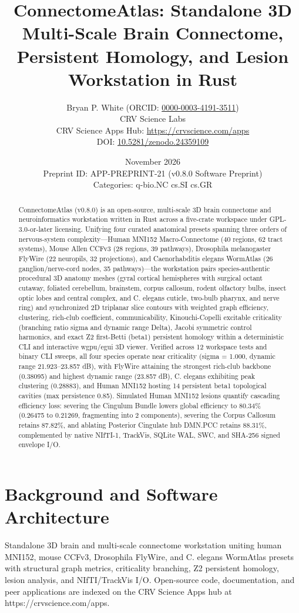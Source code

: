 \documentclass[10pt,letterpaper]{article}
\title{\textbf{ConnectomeAtlas: Standalone 3D Multi-Scale Brain Connectome, Persistent Homology, and Lesion Workstation in Rust}}
\author{Bryan P. White (ORCID: \href{https://orcid.org/0000-0003-4191-3511}{0000-0003-4191-3511}) \\ CRV Science Labs \\ \small CRV Science Apps Hub: \url{https://crvscience.com/apps} \\ \small DOI: \href{https://doi.org/10.5281/zenodo.24359109}{10.5281/zenodo.24359109}}
\date{November 2026 \\ \small Preprint ID: APP-PREPRINT-21 (v0.8.0 Software Preprint) \\ \small Categories: q-bio.NC \textbullet{} cs.SI \textbullet{} cs.GR}
\begin{document}
\maketitle

\begin{abstract}
ConnectomeAtlas (v0.8.0) is an open-source, multi-scale 3D brain connectome and neuroinformatics workstation written in Rust across a five-crate workspace under GPL-3.0-or-later licensing. Unifying four curated anatomical presets spanning three orders of nervous-system complexity---Human MNI152 Macro-Connectome (40 regions, 62 tract systems), Mouse Allen CCFv3 (28 regions, 39 pathways), Drosophila melanogaster FlyWire (22 neuropils, 32 projections), and Caenorhabditis elegans WormAtlas (26 ganglion/nerve-cord nodes, 35 pathways)---the workstation pairs species-authentic procedural 3D anatomy meshes (gyral cortical hemispheres with surgical octant cutaway, foliated cerebellum, brainstem, corpus callosum, rodent olfactory bulbs, insect optic lobes and central complex, and C. elegans cuticle, two-bulb pharynx, and nerve ring) and synchronized 2D triplanar slice contours with weighted graph efficiency, clustering, rich-club coefficient, communicability, Kinouchi-Copelli excitable criticality (branching ratio sigma and dynamic range Delta), Jacobi symmetric control harmonics, and exact Z2 first-Betti (beta1) persistent homology within a deterministic CLI and interactive wgpu/egui 3D viewer. Verified across 12 workspace tests and binary CLI sweeps, all four species operate near criticality (sigma = 1.000, dynamic range 21.923--23.857 dB), with FlyWire attaining the strongest rich-club backbone (0.38095) and highest dynamic range (23.857 dB), C. elegans exhibiting peak clustering (0.28883), and Human MNI152 hosting 14 persistent beta1 topological cavities (max persistence 0.85). Simulated Human MNI152 lesions quantify cascading efficiency loss: severing the Cingulum Bundle lowers global efficiency to 80.34\% (0.26475 to 0.21269, fragmenting into 2 components), severing the Corpus Callosum retains 87.82\%, and ablating Posterior Cingulate hub DMN.PCC retains 88.31\%, complemented by native NIfTI-1, TrackVis, SQLite WAL, SWC, and SHA-256 signed envelope I/O.
\end{abstract}

\section{Background and Software Architecture}
Standalone 3D brain and multi-scale connectome workstation uniting human MNI152, mouse CCFv3, Drosophila FlyWire, and C. elegans WormAtlas presets with structural graph metrics, criticality branching, Z2 persistent homology, lesion analysis, and NIfTI/TrackVis I/O. Open-source code, documentation, and peer applications are indexed on the CRV Science Apps hub at https://crvscience.com/apps.
\end{document}
